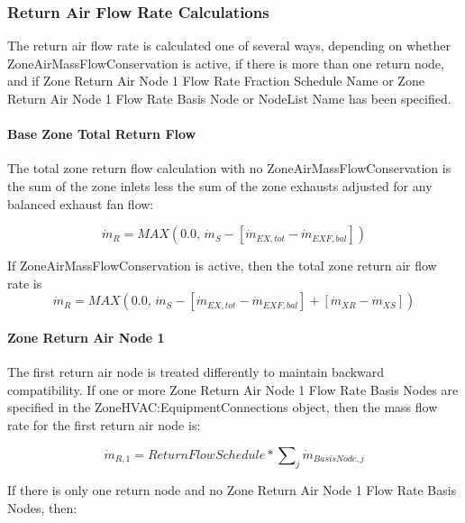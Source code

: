 \subsubsection{Return Air Flow Rate Calculations}\label{return-air-flow-rate-calculations}

The return air flow rate is calculated one of several ways, depending on whether ZoneAirMassFlowConservation is active, if there is more than one return node, and if Zone Return Air Node 1 Flow Rate Fraction Schedule Name or Zone Return Air Node 1 Flow Rate Basis Node or NodeList Name has been specified.


\paragraph{Base Zone Total Return Flow}\label{base-zone-total-return-flow}

The total zone return flow calculation with no ZoneAirMassFlowConservation is the sum of the zone inlets less the sum of the zone exhausts adjusted for any balanced exhaust fan flow:

\begin{equation}
{\dot m_{R}} = MAX\left( {0.0,\,{{\dot m}_S} - [{{\dot m}_{EX,tot}} - {\dot m_{EXF,bal}}]} \right)
\end{equation}

If ZoneAirMassFlowConservation is active, then the total zone return air flow rate is 
\begin{equation}
{\dot m_{R}} = MAX\left( {0.0,\,{{\dot m}_S} - [{{\dot m}_{EX,tot}} - {\dot m_{EXF,bal}}] + [{{\dot m}_{XR}} - {{\dot m}_{XS}}]} \right)
\end{equation}

\paragraph{Zone Return Air Node 1}\label{zone-return-air-node1}

The first return air node is treated differently to maintain backward compatibility. If one or more Zone Return Air Node 1 Flow Rate Basis Nodes are specified in the ZoneHVAC:EquipmentConnections object, then the mass flow rate for the first return air node is:

\begin{equation}
{\dot m_{R,1}} = ReturnFlowSchedule*\sum\nolimits_j {{{\dot m}_{BasisNode,j}}}
\end{equation}

If there is only one return node and no Zone Return Air Node 1 Flow Rate Basis Nodes, then:

